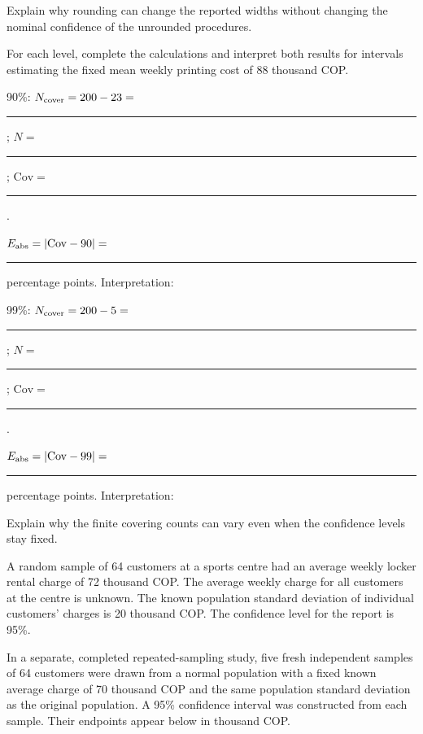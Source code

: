 \clearpage
{}
\par\smallskip
\noindent\begin{minipage}[t]{.49\linewidth}
\vspace{0pt}
\end{minipage}\hfill
\begin{minipage}[t]{.49\linewidth}
\vspace{0pt}
\end{minipage}\par
Explain why rounding can change the reported widths without changing the nominal confidence of the unrounded procedures.
\workspace{.65in}
\clearpage
{}
\par For each level, complete the calculations and interpret both results for intervals estimating the fixed mean weekly printing cost of 88 thousand COP.
\par 90\%: $N_{\rm cover}=200-23=$ \rule{.5in}{.3pt}; $N=$ \rule{.4in}{.3pt}; $\mathrm{Cov}=$ \rule{1in}{.3pt}.
\par $E_{\rm abs}=|\mathrm{Cov}-90|=$ \rule{.7in}{.3pt} percentage points. Interpretation:
\workspace{.4in}
\par 99\%: $N_{\rm cover}=200-5=$ \rule{.5in}{.3pt}; $N=$ \rule{.4in}{.3pt}; $\mathrm{Cov}=$ \rule{1in}{.3pt}.
\par $E_{\rm abs}=|\mathrm{Cov}-99|=$ \rule{.7in}{.3pt} percentage points. Interpretation:
\workspace{.4in}
\par Explain why the finite covering counts can vary even when the confidence levels stay fixed.
\workspace{.5in}

\clearpage
{}
A random sample of 64 customers at a sports centre had an average weekly locker rental charge of 72 thousand COP. The average weekly charge for all customers at the centre is unknown. The known population standard deviation of individual customers' charges is 20 thousand COP. The confidence level for the report is 95\%.

In a separate, completed repeated-sampling study, five fresh independent samples of 64 customers were drawn from a normal population with a fixed known average charge of 70 thousand COP and the same population standard deviation as the original population. A 95\% confidence interval was constructed from each sample. Their endpoints appear below in thousand COP.

